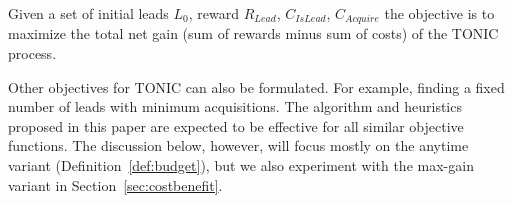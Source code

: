 \documentclass[journal]{IEEEtran}
\newcommand{\islead}[1]{{\em IsLead(#1)}}
\newcommand{\acquire}[1]{{\em Acquire(#1)}}
\begin{document}
\begin{definition}
Given a set of initial leads \(L_0\), reward \(R_{Lead}\), $C_{IsLead}$, $C_{Acquire}$ the objective is to maximize the total net gain (sum of rewards minus sum of costs) of the TONIC process.  
\label{def:gain}
\end{definition}



Other objectives for TONIC can also be formulated.  For example, finding a fixed number of leads with minimum acquisitions. The algorithm and heuristics proposed in this paper are expected to be effective for all similar objective functions. 
The discussion below, however, will focus mostly on the anytime variant (Definition~\ref{def:budget}), but we also experiment with the max-gain variant in Section~\ref{sec:costbenefit}.  

\end{document}
